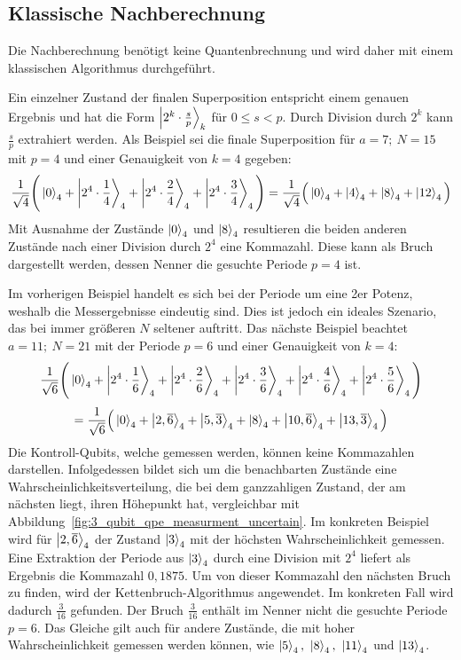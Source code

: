 \subsection{Klassische Nachberechnung} \label{Funktionsweise:klassisch}
Die Nachberechnung benötigt keine Quantenbrechnung und 
wird daher mit einem klassischen Algorithmus durchgeführt.

Ein einzelner Zustand der finalen Superposition 
entspricht einem genauen Ergebnis und hat die Form \(\ket{2^k \cdot \frac{s}{p}}_k\) für \(0 \leq s < p\).
Durch Division durch \(2^k\) kann \(\frac{s}{p}\) extrahiert werden.
Als Beispiel sei die finale Superposition für \(a = 7;~N=15\) mit \(p=4\) und einer Genauigkeit von \(k=4\) gegeben:
\[\frac{1}{\sqrt{4}}
\Bigg(\ket{0}_4 +\ket{2^4 \cdot \frac{1}{4}}_4 + \ket{2^4 \cdot \frac{2}{4}}_4+\ket{2^4 \cdot \frac{3}{4}}_4
\Bigg) =
 \frac{1}{\sqrt{4}}
 \Big(\ket{0}_4 +\ket{4}_4 + \ket{8}_4+\ket{12}_4\Big) \]
Mit Ausnahme der Zustände \(\ket{0}_4\) und \(\ket{8}_4\) 
resultieren die beiden anderen Zustände nach einer Division durch \(2^4\) eine Kommazahl. 
Diese kann als Bruch dargestellt werden, 
dessen Nenner die gesuchte Periode \(p=4\) ist.

Im vorherigen Beispiel handelt es sich bei der Periode um eine 2er Potenz, 
weshalb die Messergebnisse eindeutig sind.
Dies ist jedoch ein ideales Szenario, 
das bei immer größeren \(N\) seltener auftritt. 
Das nächste Beispiel beachtet \(a=11;~N=21\) mit der Periode \(p=6\) und einer Genauigkeit von \(k=4\):
\[\frac{1}{\sqrt{6}}
\Bigg(\ket{0}_4 +\ket{2^4 \cdot \frac{1}{6}}_4 + \ket{2^4 \cdot \frac{2}{6}}_4+
\ket{2^4 \cdot \frac{3}{6}}_4+\ket{2^4 \cdot \frac{4}{6}}_4 + \ket{2^4 \cdot \frac{5}{6}}_4
\Bigg) \]
\[= \frac{1}{\sqrt{6}}
\Big(\ket{0}_4 +\ket{2,\overline{6}}_4 + \ket{5,\overline{3}}_4+
\ket{8}_4+\ket{10,\overline{6}}_4 + \ket{13,\overline{3}}_4
\Big) \]
Die Kontroll-Qubits, welche gemessen werden, 
können keine Kommazahlen darstellen.
Infolgedessen bildet sich um die benachbarten Zustände eine Wahrscheinlichkeitsverteilung, 
die bei dem ganzzahligen Zustand, der am nächsten liegt, 
ihren Höhepunkt hat, vergleichbar mit Abbildung~\ref{fig:3_qubit_qpe_measurment_uncertain}.
Im konkreten Beispiel wird für \(\ket{2,\overline{6}}_4\) der Zustand \(\ket{3}_4\) 
mit der höchsten Wahrscheinlichkeit gemessen.
Eine Extraktion der Periode aus \(\ket{3}_4\) durch eine Division mit \(2^4\) liefert als Ergebnis die Kommazahl \(0,1875\).
Um von dieser Kommazahl den nächsten Bruch zu finden, wird der Kettenbruch-Algorithmus angewendet.
Im konkreten Fall wird dadurch \(\frac{3}{16}\) gefunden.
Der Bruch \(\frac{3}{16}\) enthält im Nenner nicht die gesuchte Periode \(p=6\). 
Das Gleiche gilt auch für andere Zustände, 
die mit hoher Wahrscheinlichkeit gemessen werden können, wie 
\(\ket{5}_4,~\ket{8}_4,~\ket{11}_4\) und \(\ket{13}_4\).

